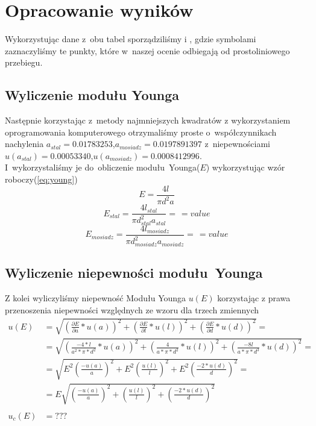 \section{Opracowanie wyników}
Wykorzystując dane z~obu tabel sporządziliśmy  i , gdzie symbolami zaznaczyliśmy te punkty, które w~naszej ocenie odbiegają od prostoliniowego
przebiegu. 
\subsection{Wyliczenie modułu Younga}
Następnie korzystając z~metody najmniejszych kwadratów z wykorzystaniem oprogramowania komputerowego otrzymaliśmy proste o~współczynnikach nachylenia $a_{stal}=0.01783253$,$a_{mosiadz}=0.0197891397$ z~niepewnościami  $u(a_{stal})=0.00053340$,$u(a_{mosiadz})=0.0008412996$.\\
I~wykorzystaliśmy je do~obliczenie modułu~Younga($E$) wykorzystując wzór roboczy(\ref{eq:young})
\begin{equation}
\label{eq:young}
    E = \frac{4l}{\pi d^2 a}
\end{equation}
\begin{equation*}
    E_{stal} = \frac{4l_{stal}}{\pi d_{stal}^2 a_{stal}}=\frac{}{}=value
\end{equation*}
\begin{equation*}
    E_{mosiadz} = \frac{4l_{mosiadz}}{\pi d_{mosiadz}^2 a_{mosiadz}}=\frac{}{}=value
\end{equation*}
\subsection{Wyliczenie niepewności modułu~Younga}
Z kolei wyliczyliśmy niepewność Modułu Younga $u(E)$ korzystając z prawa przenoszenia
niepewności względnych ze wzoru dla trzech zmiennych
\begin{equation*}
\begin{split}
    u(E)&=\sqrt{\left (\frac{\partial E}{\partial a}*u(a)\right )^2+\left (\frac{\partial E}{\partial l}*u(l)\right )^2+\left (\frac{\partial E}{\partial d}*u(d)\right )^2}=\\
&=\sqrt{\left(\frac{-4*l}{a^2*\pi *d^2}*u(a)\right)^2+\left(\frac{4}{a*\pi *d^2}*u(l)\right)^2+\left(\frac{-8l}{a*\pi *d^3}*u(d)\right)^2}=\\
&= \sqrt{E^2\left (\frac{-u(a)}{a} \right )^2 + E^2\left (\frac{u(l)}{l} \right )^2 + E^2\left (\frac{-2*u(d)}{d} \right )^2}=\\
&= E\sqrt{\left (\frac{-u(a)}{a} \right )^2 + \left (\frac{u(l)}{l} \right )^2 + \left (\frac{-2*u(d)}{d} \right )^2} \\
\\
u_c(E) &= ???
\end{split}
\end{equation*}
       
